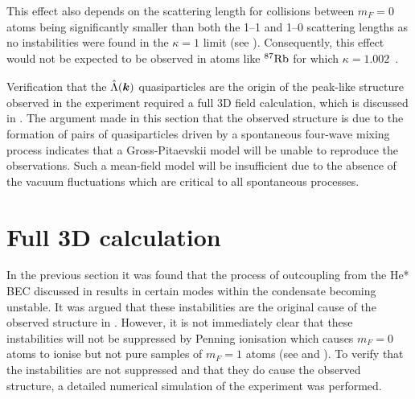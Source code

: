 This effect also depends on the scattering length for collisions between $m_F=0$ atoms being significantly smaller than both the 1--1 and 1--0 scattering lengths as no instabilities were found in the $\kappa = 1$ limit (see ). 
Consequently, this effect would not be expected to be observed in atoms like $\nucl{87}{}{Rb}$ for which $\kappa = 1.002$~\citep{Kempen:2002,Widera:2006}.

Verification that the $\hat{\Lambda}(\bm{k})$ quasiparticles are the origin of the peak-like structure observed in the experiment required a full 3D field calculation, which is discussed in .  The argument made in this section that the observed structure is due to the formation of pairs of quasiparticles driven by a spontaneous four-wave mixing process indicates that a Gross-Pitaevskii model will be unable to reproduce the observations. Such a mean-field model will be insufficient due to the absence of the vacuum fluctuations which are critical to all spontaneous processes.

\section{Full 3D calculation}
\label{Peaks:3DCalculation}
In the previous section it was found that the process of outcoupling from the He* BEC discussed in  results in certain modes within the condensate becoming unstable. It was argued that these instabilities are the original cause of the observed structure in . However, it is not immediately clear that these instabilities will not be suppressed by Penning ionisation which causes $m_F=0$ atoms to ionise but not pure samples of $m_F=1$ atoms (see  and ). To verify that the instabilities are not suppressed and that they do cause the observed structure, a detailed numerical simulation of the experiment was performed.

